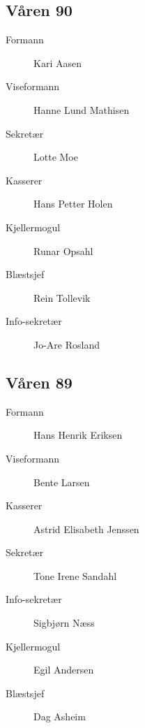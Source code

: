 {\begin{minipage}{0.6\textwidth}
\subsection*{Våren 90}

\begin{description}
	\item[Formann] Kari Aasen
	\item[Viseformann] Hanne Lund Mathisen
	\item[Sekretær] Lotte Moe
	\item[Kasserer] Hans Petter Holen
	\item[Kjellermogul] Runar Opsahl
	\item[Blæstsjef] Rein Tollevik
	\item[Info-sekretær] Jo-Are Rosland
\end{description}
\subsection*{Våren 89}

\begin{description}
	\item[Formann]  Hans Henrik Eriksen
	\item[Viseformann] Bente Larsen
	\item[Kasserer] Astrid Elisabeth Jenssen
	\item[Sekretær] Tone Irene Sandahl
	\item[Info-sekretær] Sigbjørn Næss
	\item[Kjellermogul] Egil Andersen
	\item[Blæstsjef] Dag Asheim
\end{description}
\end{minipage}
}

